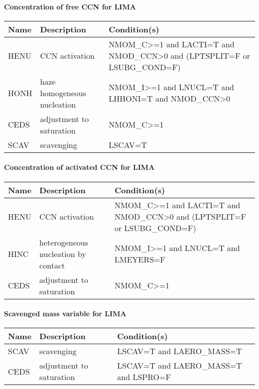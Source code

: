 \paragraph{Concentration of free CCN for LIMA}
\mbox{} %

\begin{longtable} {|p{}|p{}|p{}|}
\hline
Name & Description & Condition(s) \\
\hline \hline
\endhead
HENU   & CCN activation              & NMOM\_C>=1 and LACTI=T and NMOD\_CCN>0 and (LPTSPLIT=F or LSUBG\_COND=F) \\\hline
HONH   & haze homogeneous nucleation & NMOM\_I>=1 and LNUCL=T and LHHONI=T and NMOD\_CCN>0 \\\hline
CEDS   & adjustment to saturation    & NMOM\_C>=1 \\\hline
SCAV   & scavenging                  & LSCAV=T \\\hline
\end{longtable}

\paragraph{Concentration of activated CCN for LIMA}
\mbox{} %

\begin{longtable} {|p{}|p{}|p{}|}
\hline
Name & Description & Condition(s) \\
\hline \hline
\endhead
HENU   & CCN activation                      & NMOM\_C>=1 and LACTI=T and NMOD\_CCN>0 and (LPTSPLIT=F or LSUBG\_COND=F) \\\hline
HINC   & heterogeneous nucleation by contact & NMOM\_I>=1 and LNUCL=T and LMEYERS=F \\\hline
CEDS   & adjustment to saturation            & NMOM\_C>=1 \\\hline
\end{longtable}

\paragraph{Scavenged mass variable for LIMA}
\mbox{} %

\begin{longtable} {|p{}|p{}|p{}|}
\hline
Name & Description & Condition(s) \\
\hline \hline
\endhead
SCAV   & scavenging               & LSCAV=T and LAERO\_MASS=T \\\hline
CEDS   & adjustment to saturation & LSCAV=T and LAERO\_MASS=T and LSPRO=F \\\hline
\end{longtable}

